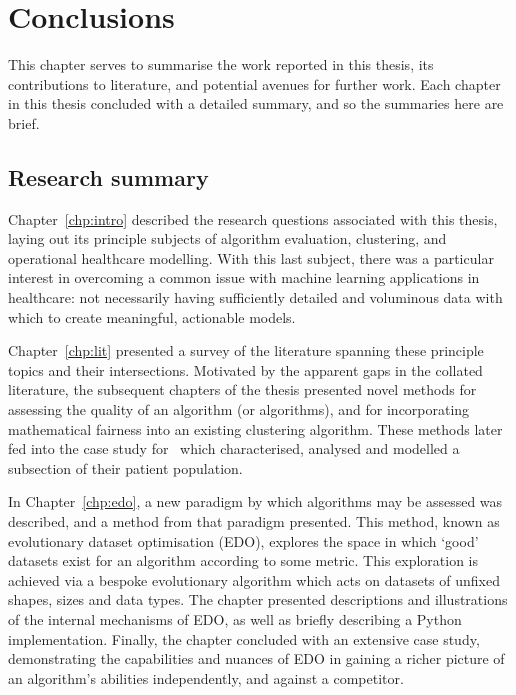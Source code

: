 \chapter{Conclusions}\label{chp:conc}

This chapter serves to summarise the work reported in this thesis, its
contributions to literature, and potential avenues for further work. Each
chapter in this thesis concluded with a detailed summary, and so the summaries
here are brief.

\section{Research summary}

Chapter~\ref{chp:intro} described the research questions associated with this
thesis, laying out its principle subjects of algorithm evaluation, clustering,
and operational healthcare modelling. With this last subject, there was a
particular interest in overcoming a common issue with machine learning
applications in healthcare: not necessarily having sufficiently detailed and
voluminous data with which to create meaningful, actionable models.

Chapter~\ref{chp:lit} presented a survey of the literature spanning these
principle topics and their intersections. Motivated by the apparent gaps in the
collated literature, the subsequent chapters of the thesis presented novel
methods for assessing the quality of an algorithm (or algorithms), and for
incorporating mathematical fairness into an existing clustering algorithm. These
methods later fed into the case study for \ctmuhb\ which characterised, analysed
and modelled a subsection of their patient population.

In Chapter~\ref{chp:edo}, a new paradigm by which algorithms may be assessed was
described, and a method from that paradigm presented. This method, known as
evolutionary dataset optimisation (EDO), explores the space in which `good'
datasets exist for an algorithm according to some metric. This exploration is
achieved via a bespoke evolutionary algorithm which acts on datasets of unfixed
shapes, sizes and data types. The chapter presented descriptions and
illustrations of the internal mechanisms of EDO, as well as briefly describing a
Python implementation. Finally, the chapter concluded with an extensive case
study, demonstrating the capabilities and nuances of EDO in gaining a richer
picture of an algorithm's abilities independently, and against a competitor.

